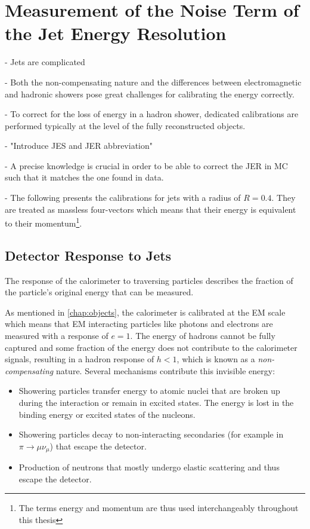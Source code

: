 \chapter{Measurement of the Noise Term of the Jet Energy Resolution}
\label{chap:calibration}

- Jets are complicated

- Both the non-compensating nature and the differences between electromagnetic and hadronic showers pose great challenges for calibrating the energy correctly.

- To correct for the loss of energy in a hadron shower, dedicated calibrations are performed typically at the level of the fully reconstructed objects.

- "Introduce JES and JER abbreviation"

- A precise knowledge is crucial in order to be able to correct the JER in MC such that it matches the one found in data.

- The following presents the calibrations for \antikt jets with a radius of $R = 0.4$. They are treated as massless four-vectors which means that their energy is equivalent to their momentum\footnote{The terms energy and momentum are thus used interchangeably throughout this thesis}.



\section{Detector Response to Jets}
The response of the calorimeter to traversing particles describes the fraction of the particle's original energy that can be measured.

As mentioned in \cref{chap:objects}, the calorimeter is calibrated at the EM scale which means that EM interacting particles like photons and electrons are measured with a response of $e = 1$. The energy of hadrons cannot be fully captured and some fraction of the energy does not contribute to the calorimeter signals, resulting in a hadron response of $h < 1$, which is known as a \emph{non-compensating} nature.
Several mechanisms contribute this invisible energy:
\begin{itemize}
    \item Showering particles transfer energy to atomic nuclei that are broken up during the interaction or remain in excited states. The energy is lost in the binding energy or excited states of the nucleons.
    \item Showering particles decay to non-interacting secondaries (for example in $\pi \rightarrow \mu \nu_\mu$) that escape the detector.
    \item Production of neutrons that mostly undergo elastic scattering and thus escape the detector.
\end{itemize}

